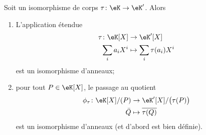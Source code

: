 \begin{lemma}        \label{LEMooGRIMooPxCXAZ}
    Soit un isomorphisme de corps \( \tau\colon \eK\to \eK'\). Alors
    \begin{enumerate}
        \item
            L'application étendue
            \begin{equation}
                \begin{aligned}
                    \tau\colon \eK[X]&\to \eK'[X] \\
                    \sum_ia_iX^i&\mapsto \sum_i\tau(a_i)X^i 
                \end{aligned}
            \end{equation}
            est un isomorphisme d'anneaux;
        \item
            pour tout \( P\in \eK[X]\), le passage au quotient
            \begin{equation}
                \begin{aligned}
                    \phi_{\tau}\colon \eK[X]/(P)&\to \eK'[X]/\big( \tau(P) \big) \\
                    \bar Q&\mapsto \overline{ \tau(Q) } 
                \end{aligned}
            \end{equation}
            est un isomorphisme d'anneaux (et d'abord est bien définie).
    \end{enumerate}
\end{lemma}

